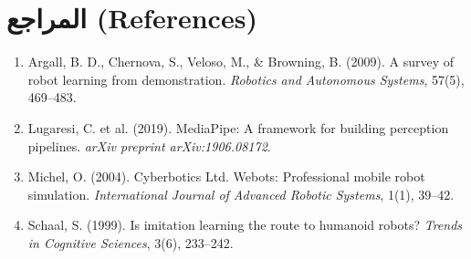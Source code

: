 \documentclass[11pt,a4paper]{article}
\begin{document}
\section*{المراجع (References)}
\begin{enumerate}
    \item Argall, B. D., Chernova, S., Veloso, M., \& Browning, B. (2009). A survey of robot learning from demonstration. \textit{Robotics and Autonomous Systems}, 57(5), 469–483.
    \item Lugaresi, C. et al. (2019). MediaPipe: A framework for building perception pipelines. \textit{arXiv preprint arXiv:1906.08172}.
    \item Michel, O. (2004). Cyberbotics Ltd. Webots: Professional mobile robot simulation. \textit{International Journal of Advanced Robotic Systems}, 1(1), 39–42.
    \item Schaal, S. (1999). Is imitation learning the route to humanoid robots? \textit{Trends in Cognitive Sciences}, 3(6), 233–242.
\end{enumerate}
\end{document}
